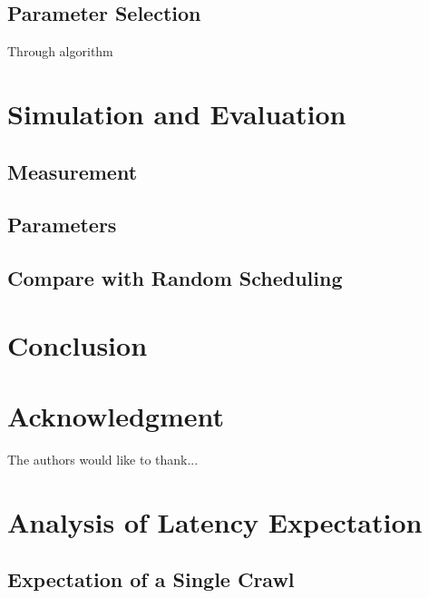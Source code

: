 \documentclass[conference]{IEEEtran}
\begin{document}
\subsection{Parameter Selection}
Through algorithm 



\section{Simulation and Evaluation}


\subsection{Measurement}

\subsection{Parameters}

\subsection{Compare with Random Scheduling}


\section{Conclusion}


\section*{Acknowledgment}


The authors would like to thank...


\ifCLASSOPTIONcaptionsoff
  \newpage
\fi





%
%
%
%

\appendices
\section{Analysis of Latency Expectation}

\subsection{Expectation of a Single Crawl}
\end{document}
